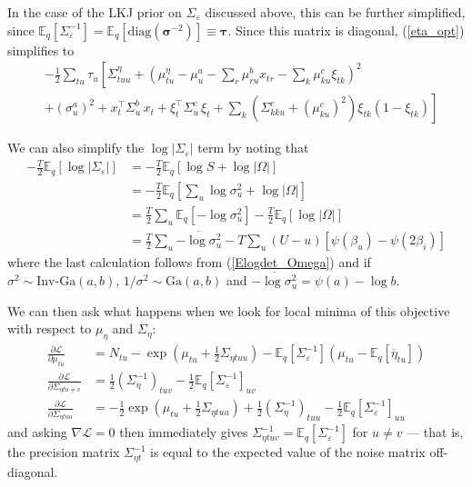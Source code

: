 \documentclass[11pt]{article}
\begin{document}
In the case of the LKJ prior on $\Sigma_\varepsilon$ discussed above, this can be further simplified, since $\mathbb{E}_q[\Sigma_\varepsilon^{-1}] = \mathbb{E}_q[\mathrm{diag}(\boldsymbol{\sigma}^{-2})] \equiv \boldsymbol{\tau}$. Since this matrix is diagonal, (\ref{eta_opt}) simplifies to
\begin{align}
    & -\frac{1}{2} \sum_{tu}\tau_u \left[ \Sigma^\eta_{tuu} +
    \left(\mu^\eta_{tu} - \mu^a_{u} - \sum_r \mu^b_{ru} x_{tr} - \sum_k \mu^c_{ku} \xi_{tk}\right)^2
    \right. \\
    & \left.
    + (\sigma^a_u)^2 + x^\top_t \Sigma^b_u\, x_t +
    \xi^\top_t \Sigma^c_u\, \xi_t +
    \sum_k (\Sigma^c_{kku} + (\mu^c_{ku})^2)\xi_{tk}(1 - \xi_{tk})
    \right]
\end{align}

We can also simplify the $\log |\Sigma_\varepsilon|$ term by noting that
\begin{align}
    -\frac{T}{2}\mathbb{E}_q[\log |\Sigma_\varepsilon|] &=
    -\frac{T}{2}\mathbb{E}_q[\log S + \log |\Omega|] \\
    &= -\frac{T}{2}\mathbb{E}_q[\sum_u \log \sigma^2_u + \log |\Omega|] \\
    &= \frac{T}{2}\sum_u \mathbb{E}_q[-\log \sigma_u^2] - \frac{T}{2}\mathbb{E}_q[\log |\Omega|] \\
    &= \frac{T}{2}\sum_u \overline{-\log \sigma_u^2}  - T\sum_{u} (U - u)[\psi(\beta_u) - \psi(2\beta_i)]
\end{align}
where the last calculation follows from (\ref{Elogdet_Omega}) and if $\sigma^2 \sim \text{Inv-Ga}(a, b)$, $1/\sigma^2 \sim \mathrm{Ga}(a, b)$ and $\overline{-\log \sigma_u^2} = \psi(a) - \log b$.

We can then ask what happens when we look for local minima of this objective with respect to $\mu_\eta$ and $\Sigma_\eta$:
\begin{align}
    \frac{\partial \mathcal{L}}{\partial \mu_{tu}} &=
    N_{tu} - \exp\left(\mu_{tu} + \frac{1}{2} \Sigma_{\eta tuu} \right)
    - \mathbb{E}_q[\Sigma_\varepsilon^{-1}](\mu_{tu} - \mathbb{E}_q[\overline{\eta}_{tu}]) \\
    \frac{\partial \mathcal{L}}{\partial \Sigma_{\eta tu \neq v}} &=
    \frac{1}{2} \left(\Sigma^{-1}_\eta \right)_{tuv}
    -\frac{1}{2}\mathbb{E}_q[\Sigma_\varepsilon^{-1}]_{uv}\\
    \frac{\partial \mathcal{L}}{\partial \Sigma_{\eta tuu}} &=
    -\frac{1}{2} \exp\left(\mu_{tu} + \frac{1}{2} \Sigma_{\eta tuu} \right)
    + \frac{1}{2} \left(\Sigma^{-1}_\eta \right)_{tuu}
    -\frac{1}{2}\mathbb{E}_q[\Sigma_\varepsilon^{-1}]_{uu}
\end{align}
and asking $\nabla \mathcal{L} = 0$ then immediately gives $\Sigma^{-1}_{\eta tuv} = \mathbb{E}_q[\Sigma_\varepsilon^{-1}]$ for $u\neq v$ --- that is, the precision matrix $\Sigma^{-1}_{\eta t}$ is equal to the expected value of the noise matrix off-diagonal.
\end{document}
